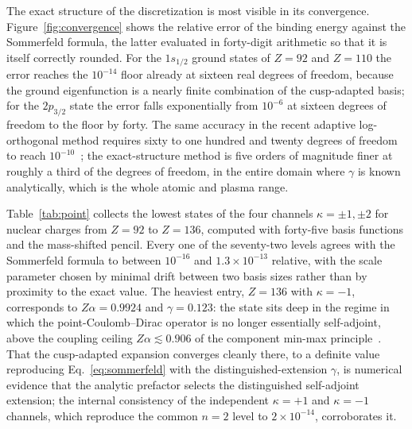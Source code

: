 \documentclass[aps,pra,twocolumn,superscriptaddress,showpacs,floatfix,longbibliography]{revtex4-2}
\newcommand{\Za}{\ensuremath{Z\alpha}}
\begin{document}
The exact structure of the discretization is most visible in its
convergence. Figure~\ref{fig:convergence} shows the relative error of the
binding energy against the Sommerfeld formula, the latter evaluated in
forty-digit arithmetic so that it is itself correctly rounded. For the
$1s_{1/2}$ ground states of $Z=92$ and $Z=110$ the error reaches the
$10^{-14}$ floor already at sixteen real degrees of freedom, because the
ground eigenfunction is a nearly finite combination of the cusp-adapted
basis; for the $2p_{3/2}$ state the error falls exponentially from
$10^{-6}$ at sixteen degrees of freedom to the floor by forty. The same
accuracy in the recent adaptive log-orthogonal method requires sixty to
one hundred and twenty degrees of freedom to reach
$10^{-10}$~\cite{ChenShaoWu2026}; the exact-structure method is five
orders of magnitude finer at roughly a third of the degrees of freedom,
in the entire domain where $\gamma$ is known analytically, which is the
whole atomic and plasma range.

Table~\ref{tab:point} collects the lowest states of the four channels
$\kappa=\pm1,\pm2$ for nuclear charges from $Z=92$ to $Z=136$, computed
with forty-five basis functions and the mass-shifted pencil. Every one of
the seventy-two levels agrees with the Sommerfeld formula to between
$10^{-16}$ and $1.3\times10^{-13}$ relative, with the scale parameter
chosen by minimal drift between two basis sizes rather than by proximity
to the exact value. The heaviest entry, $Z=136$ with $\kappa=-1$,
corresponds to $\Za=0.9924$ and $\gamma=0.123$: the state sits deep in the
regime in which the point-Coulomb--Dirac operator is no longer essentially
self-adjoint, above the coupling ceiling $\Za\lesssim0.906$ of the
component min-max principle~\cite{MorozovMuller2015}. That the
cusp-adapted expansion converges cleanly there, to a definite value
reproducing Eq.~\eqref{eq:sommerfeld} with the distinguished-extension
$\gamma$, is numerical evidence that the analytic prefactor selects the
distinguished self-adjoint extension; the internal consistency of the
independent $\kappa=+1$ and $\kappa=-1$ channels, which reproduce the
common $n=2$ level to $2\times10^{-14}$, corroborates it.
\end{document}
